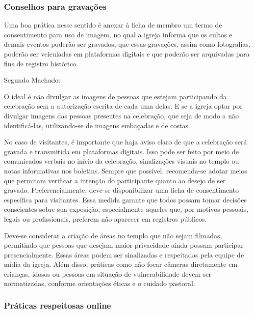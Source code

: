 \subsubsection{Conselhos para gravações}


Uma boa prática nesse sentido é anexar à ficha de membro um termo de consentimento para uso de imagem, no qual a igreja informa que os cultos e demais eventos poderão ser gravados, que essas gravações, assim como fotografias, poderão ser veiculadas em plataformas digitais e que poderão ser arquivadas para fins de registro histórico.

Segundo Machado:
\begin{citacao}
    O ideal é não divulgar as imagens de pessoas que estejam participando da celebração sem a autorização escrita de cada uma delas. E se a igreja optar por divulgar imagens das pessoas presentes na celebração, que seja de modo a não identificá-las, utilizando-se de imagens embaçadas e de costas.\cite[p.~12]{machado2020}
\end{citacao}

No caso de visitantes, é importante que haja aviso claro de que a celebração será gravada e transmitida em plataformas digitais. Isso pode ser feito por meio de comunicados verbais no início da celebração, sinalizações visuais no templo ou notas informativas nos boletins. Sempre que possível, recomenda-se adotar meios que permitam verificar a intenção do participante quanto ao desejo de ser gravado. Preferencialmente, deve-se disponibilizar uma ficha de consentimento específica para visitantes. Essa medida garante que todos possam tomar decisões conscientes sobre sua exposição, especialmente aqueles que, por motivos pessoais, legais ou profissionais, preferem não aparecer em registros públicos.


Deve-se considerar a criação de áreas no templo que não sejam filmadas, permitindo que pessoas que desejam maior privacidade ainda possam participar presencialmente. Essas áreas podem ser sinalizadas e respeitadas pela equipe de mídia da igreja. Além disso, práticas como não focar câmeras diretamente em crianças, idosos ou pessoas em situação de vulnerabilidade devem ser normatizadas, conforme orientações éticas e o cuidado pastoral.

\subsubsection{Práticas respeitosas online}


